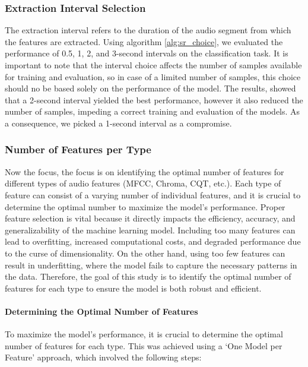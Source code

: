 \subsubsection*{Extraction Interval Selection}  %
\label{sec:extraction_interval}
The extraction interval refers to the duration of the audio segment from which the features are extracted.
Using algorithm \ref{alg:sr_choice}, we evaluated the performance of 0.5, 1, 2, and 3-second intervals
on the classification task. It is important to note that the interval choice affects the number of samples
available for training and evaluation, so in case of a limited number of samples, this choice should no be based
solely on the performance of the model. The results, showed that a 2-second interval yielded the best performance,
however it also reduced the number of samples, impeding a correct training and evaluation of the models.
As a consequence, we picked a 1-second interval as a compromise.

\subsubsection*{Number of Features per Type} %
Now the focus, the focus is on identifying the optimal number of features for different types of audio features (MFCC, Chroma, CQT, etc.).
Each type of feature can consist of a varying number of individual features, and it is crucial to determine the optimal number to maximize
the model's performance. Proper feature selection is vital because it directly impacts the efficiency, accuracy,
and generalizability of the machine learning model. Including too many features can lead to overfitting, increased computational costs,
and degraded performance due to the curse of dimensionality. On the other hand, using too few features can result in underfitting,
where the model fails to capture the necessary patterns in the data. Therefore, the goal of this study is to identify the optimal number of features
for each type to ensure the model is both robust and efficient.

\paragraph{Determining the Optimal Number of Features}

To maximize the model's performance, it is crucial to determine the optimal number of features for each type.
This was achieved using a `One Model per Feature' approach, which involved the following steps:

